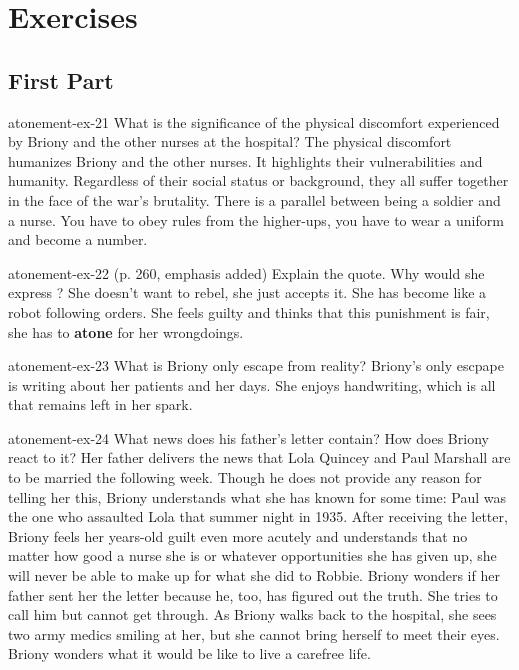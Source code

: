 \documentclass[preview]{standalone}
\begin{document}
\genpage

\section{Exercises}

\subsection{First Part}

\begin{snippetexercise}{atonement-ex-21}
    {What is the significance of the physical discomfort experienced by Briony and the other nurses at
    the hospital?}
    The physical discomfort humanizes Briony and the other nurses.
    It highlights their vulnerabilities and humanity. Regardless of their social
    status or background, they all suffer together in the face of the war's brutality.
    There is a parallel between being a soldier and a nurse. You have to obey
    rules from the higher-ups, you have to wear a uniform and become a number.
\end{snippetexercise}

\begin{snippetexercise}{atonement-ex-22}
    { (p. 260, emphasis added) Explain the quote. Why would she express ?}
    She doesn't want to rebel, she just accepts it. She has become like a robot
    following orders.
    She feels guilty and thinks that this punishment is fair,
    she has to \textbf{atone} for her wrongdoings.
\end{snippetexercise}

\begin{snippetexercise}{atonement-ex-23}
    {What is Briony only escape from reality?}
    Briony's only escpape is writing about her patients and her days.
    She enjoys handwriting, which is all that remains left in her spark.
\end{snippetexercise}

\begin{snippetexercise}{atonement-ex-24}
    {What news does his father's letter contain? How does Briony react to it?}
    Her father delivers the news that Lola Quincey and Paul Marshall are to
    be married the following week.
    Though he does not provide any reason for telling her this,
    Briony understands what she has known for some time:
    Paul was the one who assaulted Lola that summer night in 1935.
    After receiving the letter, Briony feels her years-old guilt
    even more acutely and understands that no matter how good a nurse she is
    or whatever opportunities she has given up,
    she will never be able to make up for what she did to Robbie.
    Briony wonders if her father sent her the letter because he, too, has figured out the truth.
    She tries to call him but cannot get through.
    As Briony walks back to the hospital,
    she sees two army medics smiling at her, but she cannot bring herself to meet their eyes.
    Briony wonders what it would be like to live a carefree life.
\end{snippetexercise}
\end{document}

